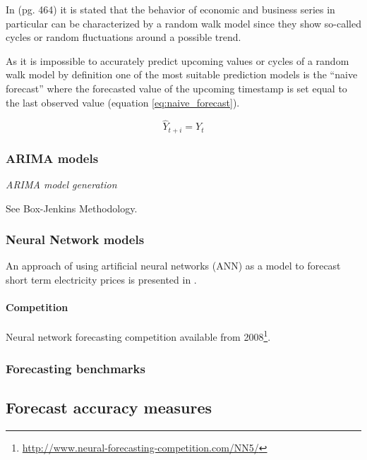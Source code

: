 In \cite{makridakisforecasting}(pg. 464) it is stated that the behavior of economic and business series in particular can be characterized by a random walk model since they show so-called cycles or random fluctuations around a possible trend. 

As it is impossible to accurately predict upcoming values or cycles of a random walk model by definition one of the most suitable prediction models is the ``naive forecast'' where the forecasted value of the upcoming timestamp is set equal to the last observed value (equation \ref{eq:naive_forecast}).

\begin{equation}
\hat{Y}_{t+i} = Y_t
\label{eq:naive_forecast}
\end{equation}



\subsubsection{ARIMA models}

\emph{ARIMA model generation}

See Box-Jenkins Methodology. 


\subsubsection{Neural Network models}

An approach of using artificial neural networks (ANN) as a model to forecast short term electricity prices is presented in \cite{szkuta1999electricity}. 


\paragraph{Competition}

Neural network forecasting competition available from 2008\footnote{\url{http://www.neural-forecasting-competition.com/NN5/}}. 




\subsubsection{Forecasting benchmarks}






\subsection{Forecast accuracy measures}



